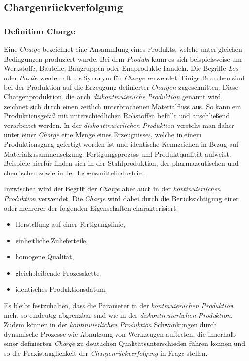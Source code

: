 \subsection{Chargenrückverfolgung} \label{sec:batch-traceability}

\subsubsection{Definition Charge}

Eine \textit{Charge} bezeichnet eine Ansammlung eines Produkts, welche unter gleichen Bedingungen produziert wurde. Bei dem \textit{Produkt} kann es sich beispielsweise um Werkstoffe, Bauteile, Baugruppen oder Endprodukte handeln. Die Begriffe \textit{Los} oder \textit{Partie} werden oft als Synonym für \textit{Charge} verwendet. Einige Branchen sind bei der Produktion auf die Erzeugung definierter \textit{Chargen} zugeschnitten. Diese Chargenproduktion, die auch \textit{diskontinuierliche Produktion} genannt wird, zeichnet sich durch einen zeitlich unterbrochenen Materialfluss aus. So kann ein Produktionsgefäß mit unterschiedlichen Rohstoffen befüllt und anschließend verarbeitet werden. In der \textit{diskontinuierlichen Produktion} versteht man daher unter einer \textit{Charge} eine Menge eines Erzeugnisses, welche in einem Produktionsgang gefertigt worden ist und identische Kennzeichen in Bezug auf Materialzusammensetzung, Fertigungsprozess und Produktqualität aufweist. Beispiele hierfür finden sich in der Stahlproduktion, der pharmazeutischen und chemischen sowie in der Lebensmittelindustrie \citep{Guenther2012}.

Inzwischen wird der Begriff der \textit{Charge} aber auch in der \textit{kontinuierlichen Produktion} verwendet. Die \textit{Charge} wird dabei durch die Berücksichtigung einer oder mehrerer der folgenden Eigenschaften charakterisiert:

\begin{itemize}
  \item Herstellung auf einer Fertigungslinie,
  \item einheitliche Zulieferteile,
  \item homogene Qualität,
  \item gleichbleibende Prozesskette,
  \item identisches Produktionsdatum.
\end{itemize}

Es bleibt festzuhalten, dass die Parameter in der \textit{kontinuierlichen Produktion} nicht so eindeutig abgrenzbar sind wie in der \textit{diskontinuierlichen Produktion}. Zudem können in der \textit{kontinuierlichen Produktion} Schwankungen durch dynamische Prozesse wie Abnutzung von Werkzeugen auftreten, die innerhalb einer definierten \textit{Charge} zu deutlichen Qualitätsunterschieden führen können und so die Praxistauglichkeit der \textit{Chargenrückverfolgung} in Frage stellen.

